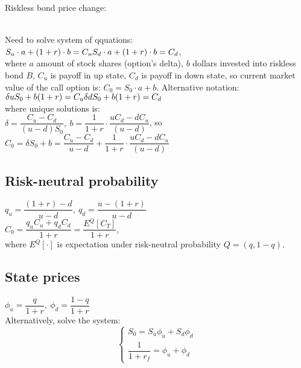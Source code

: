 Riskless bond price change:\\
\\
Need to solve system of qquations:\\
$S_u\cdot a + (1+r)\cdot b = C_u \\ S_d\cdot a + (1+r)\cdot b = C_d$, \\
where $a$ amount of stock shares (option's delta), $b$ dollars invested into riskless bond $B$, $C_u$ is payoff in up state, $C_d$ is payoff in down state, so current market value of the call option is: $C_0 = S_0\cdot a + b$.
Alternative notation: \\
$\delta uS_0 + b(1+r) = C_u \\ \delta dS_0 + b(1+r) = C_d$\\
where unique solutions is:\\
$\delta = \dfrac{C_u-C_d}{(u -d)S_0},\ b=\dfrac{1}{1+r}\cdot\dfrac{uC_d - dC_u}{(u-d)}$, so\\
$C_0 = \delta S_0 + b = \dfrac{C_u-C_d}{u -d} + \dfrac{1}{1+r}\cdot\dfrac{uC_d - dC_u}{(u-d)}$\\
\subsection*{Risk-neutral probability}
$q_u = \dfrac{(1+r) -d}{u-d},\ q_d=\dfrac{u-(1+r)}{u-d}$\\
$C_0=\dfrac{q_uC_u + q_dC_d}{1+r} = \dfrac{E^Q[C_T]}{1+r}$,\\ where
$E^Q[\cdot]$ is expectation under risk-neutral probability $Q = (q, 1-q)$.
\subsection*{State prices}
$\phi_u=\dfrac{q}{1+r},\ \phi_d=\dfrac{1-q}{1+r}$\\
Alternatively, solve the system:
$$
\begin{cases}
S_0 = S_u\phi_u + S_d\phi_d\\
\dfrac{1}{1+r_f} = \phi_u + \phi_d
\end{cases}
$$\\
